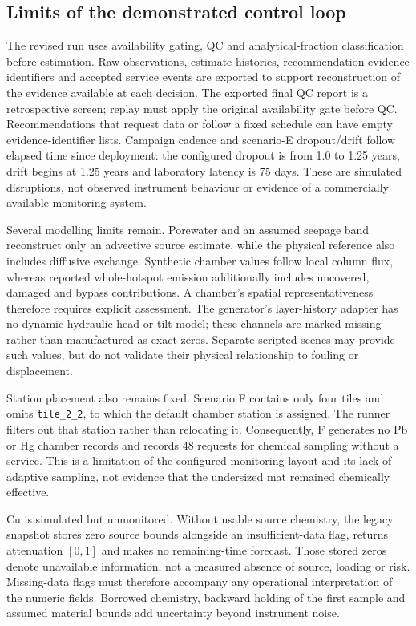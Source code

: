 \subsection{Limits of the demonstrated control loop}
\label{sec:control-limitations}

The revised run uses availability gating, QC and analytical-fraction classification before estimation. Raw observations, estimate histories, recommendation evidence identifiers and accepted service events are exported to support reconstruction of the evidence available at each decision. The exported final QC report is a retrospective screen; replay must apply the original availability gate before QC. Recommendations that request data or follow a fixed schedule can have empty evidence-identifier lists. Campaign cadence and scenario-E dropout/drift follow elapsed time since deployment: the configured dropout is from 1.0 to 1.25 years, drift begins at 1.25 years and laboratory latency is 75 days. These are simulated disruptions, not observed instrument behaviour or evidence of a commercially available monitoring system.

Several modelling limits remain. Porewater and an assumed seepage band reconstruct only an advective source estimate, while the physical reference also includes diffusive exchange. Synthetic chamber values follow local column flux, whereas reported whole-hotspot emission additionally includes uncovered, damaged and bypass contributions. A chamber's spatial representativeness therefore requires explicit assessment. The generator's layer-history adapter has no dynamic hydraulic-head or tilt model; these channels are marked missing rather than manufactured as exact zeros. Separate scripted scenes may provide such values, but do not validate their physical relationship to fouling or displacement.

Station placement also remains fixed. Scenario F contains only four tiles and omits \texttt{tile\_2\_2}, to which the default chamber station is assigned. The runner filters out that station rather than relocating it. Consequently, F generates no Pb or Hg chamber records and records 48 requests for chemical sampling without a service. This is a limitation of the configured monitoring layout and its lack of adaptive sampling, not evidence that the undersized mat remained chemically effective.

Cu is simulated but unmonitored. Without usable source chemistry, the legacy snapshot stores zero source bounds alongside an insufficient-data flag, returns attenuation $[0,1]$ and makes no remaining-time forecast. Those stored zeros denote unavailable information, not a measured absence of source, loading or risk. Missing-data flags must therefore accompany any operational interpretation of the numeric fields. Borrowed chemistry, backward holding of the first sample and assumed material bounds add uncertainty beyond instrument noise.


